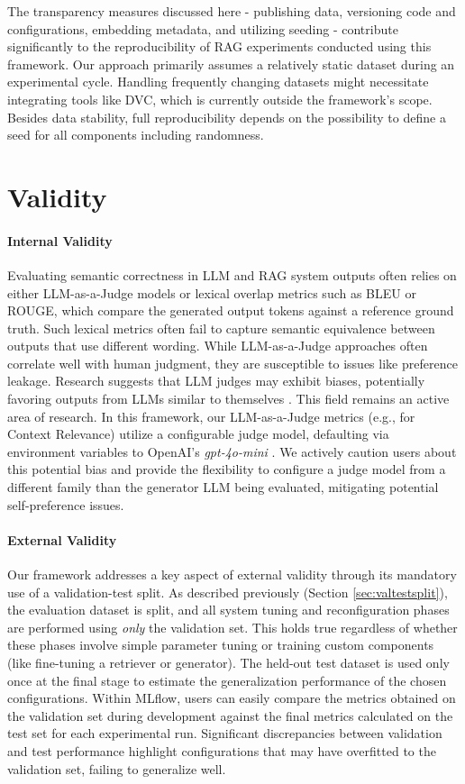 The transparency measures discussed here - publishing data, versioning code and configurations, embedding metadata, and utilizing seeding - contribute significantly to the reproducibility of RAG experiments conducted using this framework. Our approach primarily assumes a relatively static dataset during an experimental cycle. Handling frequently changing datasets might necessitate integrating tools like DVC, which is currently outside the framework's scope. Besides data stability, full reproducibility depends on the possibility to define a seed for all components including randomness.

\section{Validity}

\paragraph{Internal Validity}
Evaluating semantic correctness in LLM and RAG system outputs often relies on either LLM-as-a-Judge models or lexical overlap metrics such as BLEU or ROUGE, which compare the generated output tokens against a reference ground truth. Such lexical metrics often fail to capture semantic equivalence between outputs that use different wording. While LLM-as-a-Judge approaches often correlate well with human judgment, they are susceptible to issues like preference leakage. Research suggests that LLM judges may exhibit biases, potentially favoring outputs from LLMs similar to themselves \cite{Li.03.02.2025}. This field remains an active area of research. In this framework, our LLM-as-a-Judge metrics (e.g., for Context Relevance) utilize a configurable judge model, defaulting via environment variables to OpenAI's \textit{gpt-4o-mini} \cite{OpenAI_2022}. We actively caution users about this potential bias and provide the flexibility to configure a judge model from a different family than the generator LLM being evaluated, mitigating potential self-preference issues.

\paragraph{External Validity}
Our framework addresses a key aspect of external validity through its mandatory use of a validation-test split. As described previously (Section \ref{sec:valtestsplit}), the evaluation dataset is split, and all system tuning and reconfiguration phases are performed using \textit{only} the validation set. This holds true regardless of whether these phases involve simple parameter tuning or training custom components (like fine-tuning a retriever or generator). The held-out test dataset is used only once at the final stage to estimate the generalization performance of the chosen configurations. Within MLflow, users can easily compare the metrics obtained on the validation set during development against the final metrics calculated on the test set for each experimental run. Significant discrepancies between validation and test performance highlight configurations that may have overfitted to the validation set, failing to generalize well.

